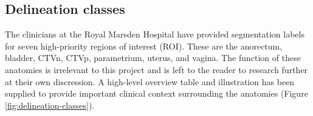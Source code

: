 \documentclass[11pt,twoside]{report}
\begin{document}


\subsection{Delineation classes}\label{sect:delineation-classes}

The clinicians at the Royal Marsden Hospital have provided segmentation labels for seven high-priority regions of interest (ROI). These are the anorectum, bladder, CTVn, CTVp, parametrium, uterus, and vagina. The function of these anatomies is irrelevant to this project and is left to the reader to research further at their own discression. A high-level overview table and illustration has been supplied to provide important clinical context surrounding the anatomies (Figure \ref{fig:delineation-classes}).
\end{document}
